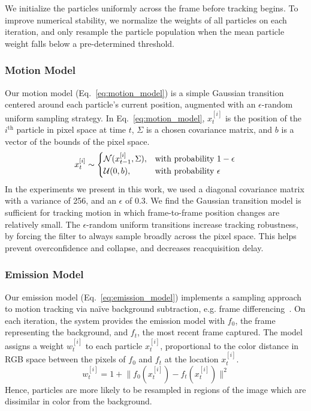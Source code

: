 \documentclass{aamas2013}
\providecommand{\norm}[1]{\lVert#1\rVert}
\begin{document}
We initialize the particles 
uniformly across the frame before tracking begins. To improve numerical 
stability, we normalize the weights of all particles on each iteration, and 
only resample the particle population when the mean particle weight falls 
below a pre-determined threshold. 
\subsubsection{Motion Model}
Our motion model (Eq.~\ref{eq:motion_model}) is a simple Gaussian transition 
centered around each particle's current position, augmented with an 
$\epsilon$-random uniform sampling strategy. In Eq.~\ref{eq:motion_model}, 
$x^{[i]}_t$ is the position of the $i^\text{th}$ particle in pixel space at 
time $t$, $\Sigma$ is a chosen covariance matrix, and $b$ is a vector of the 
bounds of the pixel space.
\begin{equation}
\label{eq:motion_model}
x^{[i]}_t \sim \begin{cases}
\mathcal{N}(x^{[i]}_{t-1}, \Sigma), &\text{with probability } 1-\epsilon \\
\mathcal{U}(0,b),& \text{with probability } \epsilon \\
\end{cases}\\
\end{equation}
In the experiments we present in this work, we used a diagonal covariance matrix 
with a variance of 256, and an $\epsilon$ of 0.3. We find the Gaussian 
transition model is sufficient for tracking motion in which frame-to-frame 
position changes are relatively small. The $\epsilon$-random uniform 
transitions increase tracking robustness, by forcing the filter to always 
sample broadly across the pixel space. This helps prevent overconfidence 
and collapse, and decreases reacquisition delay. 

\subsubsection{Emission Model}
Our emission model (Eq.~\ref{eq:emission_model}) implements a sampling
approach to motion tracking via na\"{i}ve background subtraction, e.g. frame 
differencing~\cite{Ahad2011Computer}. On each iteration, the system provides the emission 
model with $f_0$, the frame representing the background, and $f_t$, the most 
recent frame captured. The model assigns a weight $w^{[i]}_t$ to each 
particle $x^{[i]}_t$, proportional to the color distance in RGB space 
between the pixels of $f_0$ and $f_t$ at the location $x^{[i]}_t$.
\begin{equation}
\label{eq:emission_model}
w^{[i]}_t = 1 + \norm{f_0(x^{[i]}_t)-f_t(x^{[i]}_t)}^2
\end{equation} 
Hence, particles are more likely to be resampled in regions of 
the image which are dissimilar in color from the background.
\end{document}
